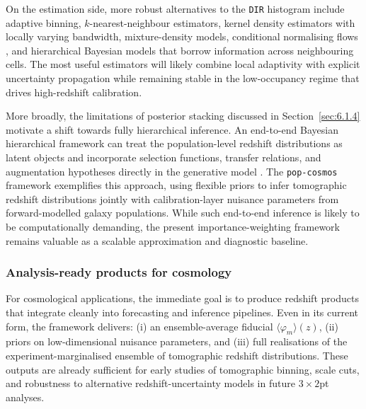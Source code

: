On the estimation side, more robust alternatives to the \texttt{DIR} histogram include adaptive binning, \(k\)-nearest-neighbour estimators, kernel density estimators with locally varying bandwidth, mixture-density models, conditional normalising flows \citep{2019arXiv191202762P}, and hierarchical Bayesian models that borrow information across neighbouring cells. The most useful estimators will likely combine local adaptivity with explicit uncertainty propagation while remaining stable in the low-occupancy regime that drives high-redshift calibration.

More broadly, the limitations of posterior stacking discussed in Section~\ref{sec:6.1.4} motivate a shift towards fully hierarchical inference. An end-to-end Bayesian hierarchical framework can treat the population-level redshift distributions as latent objects and incorporate selection functions, transfer relations, and augmentation hypotheses directly in the generative model \citep{2019ApJ...881...80L}. The \texttt{pop-cosmos} framework \citep{2024ApJS..274...12A, 2026arXiv260203930H, 2026arXiv260203935L} exemplifies this approach, using flexible priors to infer tomographic redshift distributions jointly with calibration-layer nuisance parameters from forward-modelled galaxy populations. While such end-to-end inference is likely to be computationally demanding, the present importance-weighting framework remains valuable as a scalable approximation and diagnostic baseline.

\subsubsection{Analysis-ready products for cosmology} \label{sec:6.2.4}

For cosmological applications, the immediate goal is to produce redshift products that integrate cleanly into forecasting and inference pipelines. Even in its current form, the framework delivers: (i) an ensemble-average fiducial \(\langle \varphi_m \rangle(z)\), (ii) priors on low-dimensional nuisance parameters, and (iii) full realisations of the experiment-marginalised ensemble of tomographic redshift distributions. These outputs are already sufficient for early studies of tomographic binning, scale cuts, and robustness to alternative redshift-uncertainty models in future \(3\times2\)pt analyses.

